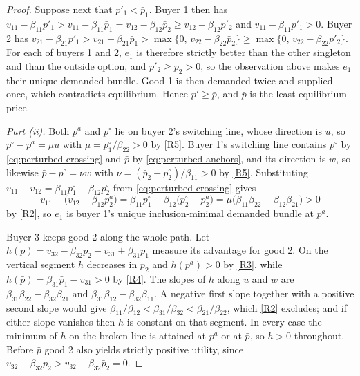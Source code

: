 \documentclass[11pt,a4paper,fleqn]{article}
\theoremstyle{plain}
\theoremstyle{definition}
\begin{document}
\begin{proof}
Suppose next that $p'_1<\bar p_1$. Buyer 1 then has $v_{11}-\beta_{11}p'_1>v_{11}-\beta_{11}\bar p_1=v_{12}-\beta_{12}\bar p_2\ge v_{12}-\beta_{12}p'_2$ and $v_{11}-\beta_{11}p'_1>0$. Buyer 2 has $v_{21}-\beta_{21}p'_1>v_{21}-\beta_{21}\bar p_1>\max\{0,\,v_{22}-\beta_{22}\bar p_2\}\ge\max\{0,\,v_{22}-\beta_{22}p'_2\}$. For each of buyers 1 and 2, $e_1$ is therefore strictly better than the other singleton and than the outside option, and $p'_2\ge\bar p_2>0$, so the observation above makes $e_1$ their unique demanded bundle. Good 1 is then demanded twice and supplied once, which contradicts equilibrium. Hence $p'\ge\bar p$, and $\bar p$ is the least equilibrium price.

\emph{Part \textup{(ii)}.} Both $p^a$ and $p^\circ$ lie on buyer 2's switching line, whose direction is $u$, so $p^\circ-p^a=\mu u$ with $\mu=p^\circ_1/\beta_{22}>0$ by \ref{R5}. Buyer 1's switching line contains $p^\circ$ by \eqref{eq:perturbed-crossing} and $\bar p$ by \eqref{eq:perturbed-anchors}, and its direction is $w$, so likewise $\bar p-p^\circ=\nu w$ with $\nu=(\bar p_2-p^\circ_2)/\beta_{11}>0$ by \ref{R5}. Substituting $v_{11}-v_{12}=\beta_{11}p^\circ_1-\beta_{12}p^\circ_2$ from \eqref{eq:perturbed-crossing} gives
\begin{equation}\label{eq:buyer1-first-segment}
v_{11}-\bigl(v_{12}-\beta_{12}p^a_2\bigr)
=\beta_{11}p^\circ_1-\beta_{12}\bigl(p^\circ_2-p^a_2\bigr)
=\mu\bigl(\beta_{11}\beta_{22}-\beta_{12}\beta_{21}\bigr)>0
\end{equation}
by \ref{R2}, so $e_1$ is buyer 1's unique inclusion-minimal demanded bundle at $p^a$.

Buyer 3 keeps good 2 along the whole path. Let $h(p)=v_{32}-\beta_{32}p_2-v_{31}+\beta_{31}p_1$ measure its advantage for good 2. On the vertical segment $h$ decreases in $p_2$ and $h(p^a)>0$ by \ref{R3}, while $h(\bar p)=\beta_{31}\bar p_1-v_{31}>0$ by \ref{R4}. The slopes of $h$ along $u$ and $w$ are $\beta_{31}\beta_{22}-\beta_{32}\beta_{21}$ and $\beta_{31}\beta_{12}-\beta_{32}\beta_{11}$. A negative first slope together with a positive second slope would give $\beta_{11}/\beta_{12}<\beta_{31}/\beta_{32}<\beta_{21}/\beta_{22}$, which \ref{R2} excludes; and if either slope vanishes then $h$ is constant on that segment. In every case the minimum of $h$ on the broken line is attained at $p^a$ or at $\bar p$, so $h>0$ throughout. Before $\bar p$ good 2 also yields strictly positive utility, since $v_{32}-\beta_{32}p_2>v_{32}-\beta_{32}\bar p_2=0$.


\end{proof}
\end{document}
